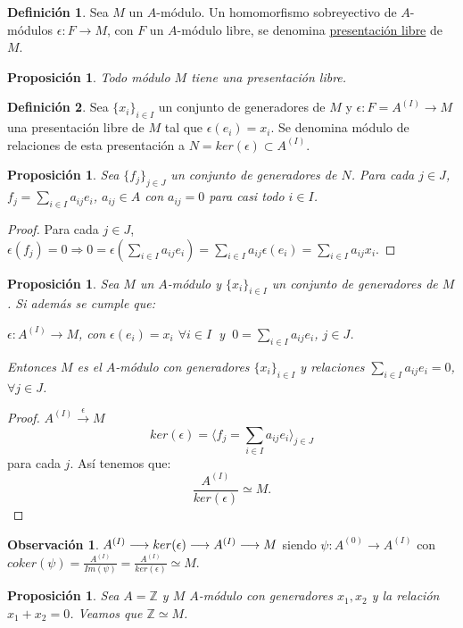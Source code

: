 \documentclass{article}
\theoremstyle{theorem-style}  %
\newtheorem{proposition}[theorem]{Proposición}
\theoremstyle{definition}
\newtheorem{definition}{Definición}[section]
\newtheorem*{observation}{Observación} %
\theoremstyle{example-style}
\begin{document}
	\begin{definition}
		Sea $M$ un $A$-módulo. Un homomorfismo sobreyectivo de $A$-módulos $\epsilon : F \longrightarrow M$, con $F$ un $A$-módulo libre, se denomina \underline{presentación libre} de $M$.
	\end{definition}
	\begin{proposition}
		Todo módulo $M$ tiene una presentación libre.
	\end{proposition}
	\begin{definition}
		Sea $\{x_i\}_{i\in I}$ un conjunto de generadores de $M$ y $\epsilon : F = A^{(I)} \longrightarrow M$ una presentación libre de $M$ tal que $\epsilon (e_i) = x_i$. Se denomina módulo de relaciones de esta presentación a $N = ker(\epsilon) \subset A^{(I)}$.
	\end{definition}
	\begin{proposition}
		Sea $\{f_j\}_{j\in J}$ un conjunto de generadores de $N$. Para cada $j\in J$, $f_j = \sum_{i\in I} a_{ij}e_i$, $a_{ij}\in A$ con $a_{ij} = 0$ para casi todo $i\in I$.
	\end{proposition}
	\begin{proof}
		Para cada $j\in J$, $\epsilon (f_j) = 0 \Rightarrow 0 = \epsilon (\sum_{i\in I} a_{ij}e_i) = \sum_{i\in I} a_{ij} \epsilon (e_i) = \sum_{i\in I} a_{ij} x_i$.
	\end{proof}
	\begin{proposition}
		Sea $M$ un $A$-módulo y $\{x_i\}_{i\in I}$ un conjunto de generadores de $M$. Si además se cumple que:
		\begin{center}
			$\epsilon : A^{(I)} \longrightarrow M$, con $\epsilon (e_i) = x_i$ $\forall i\in I$  $\ $y$\ $  $0 = \sum_{i\in I} a_{ij}e_i$, $j\in J$.
		\end{center}
		Entonces $M$ es el $A$-módulo con generadores $\{x_i\}_{i\in I}$ y relaciones $\sum_{i\in I} a_{ij}e_i = 0$, $\forall j\in J$.
	\end{proposition}
	\begin{proof}
		$A^{(I)} \stackrel{\epsilon}{\longrightarrow} M$
		\[ker(\epsilon) = \langle f_j = \sum_{i\in I} a_{ij}e_i\rangle_{j\in J}\]
		para cada $j$. Así tenemos que:
		\[\frac{A^{(I)}}{ker(\epsilon)}\simeq M.\]
	\end{proof}
	\begin{observation}
		$A^{(I)} \longrightarrow ker(\epsilon) \longrightarrow A^{(I)} \longrightarrow M \\$
		siendo $\psi: A^{(0)} \longrightarrow A^{(I)}$ con $coker(\psi) = \frac{A^{(I)}}{Im(\psi)} = \frac{A^{(I)}}{ker(\epsilon)} \simeq M$.
	\end{observation}
	\begin{proposition}
		Sea $A=\mathbb{Z}$ y $M$ $A$-módulo con generadores $x_1,x_2$ y la relación $x_1+x_2=0$. Veamos que $\mathbb{Z}\simeq M$.
	\end{proposition}
\end{document}

